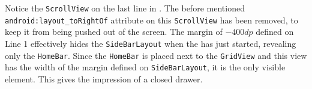 Notice the \lstinline|ScrollView| on the last line in .
The before mentioned \lstinline{android:layout_toRightOf} attribute on this \lstinline|ScrollView| has been removed, to keep it from being pushed out of the screen.
The margin of $-400dp$ defined on Line 1 effectively hides the \lstinline|SideBarLayout| when the \homeactivity has just started, revealing only the \lstinline|HomeBar|.
Since the \lstinline|HomeBar| is placed next to the \lstinline|GridView| and this view has the width of the margin defined on \lstinline|SideBarLayout|, it is the only visible element.
This gives the impression of a closed drawer.